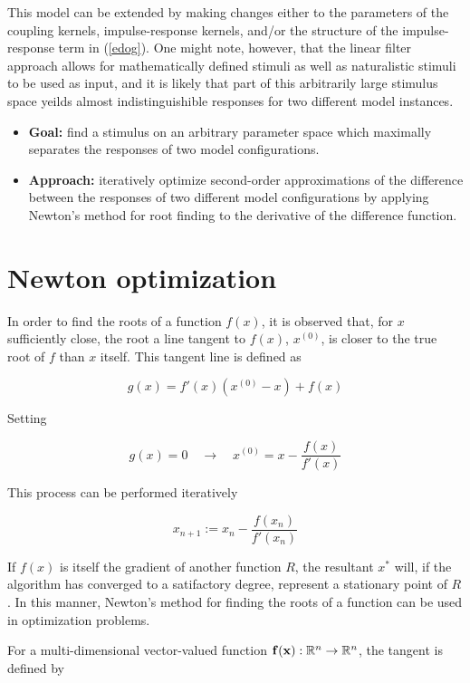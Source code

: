 \documentclass{article}
\newcommand{\R}{\mathbb{R}}
\newcommand{\vect}[1]{\textbf{\textrm{#1}}}
\begin{document}
This model can be extended by making changes either to the parameters of the coupling kernels, impulse-response kernels, and/or the structure of the impulse-response term in (\ref{edog}). 
One might note, however, that the linear filter approach allows for mathematically defined stimuli as well as naturalistic stimuli to be used as input, and it is likely that part of this arbitrarily large stimulus space yeilds almost indistinguishible responses for two different model instances.

\begin{itemize}[label={}]
	\item \textbf{Goal:} find a stimulus on an arbitrary parameter space which maximally separates 	
		  the responses of two model configurations.
	\item \textbf{Approach:} iteratively optimize second-order approximations of the difference    
	      between the responses of two different model configurations by applying Newton's method 			  for root finding to the derivative of the difference function.
\end{itemize}


\section{Newton optimization} \label{newtonmethod}
In order to find the roots of a function $f(x)$, it is observed that, for $x$ sufficiently close, the root a line tangent to $f(x)$, $x^{(0)}$, is closer to the true root of $f$ than $x$ itself. 
This tangent line is defined as

\begin{equation} \label{tangent1d}
	g(x) = f'(x)(x^{(0)} - x) + f(x)
\end{equation}

Setting

\begin{equation*}
	g(x) = 0 \quad \longrightarrow \quad x^{(0)} = x - \frac{f(x)}{f'(x)}
\end{equation*}

This process can be performed iteratively

\begin{equation} \label{updaterule1d}
	x_{n+1} := x_n - \frac{f(x_n)}{f'(x_n)}
\end{equation}

If $f(x)$ is itself the gradient of another function $R$, the resultant $x^*$ will, if the algorithm has converged to a satifactory degree, represent a stationary point of $R$. 
In this manner, Newton's method for finding the roots of a function can be used in optimization problems. \par 
\hfill \newline
For a multi-dimensional vector-valued function $\vect{f}(\vect{x}): \R^n \rightarrow \R^n$, the tangent is defined by
\end{document}

